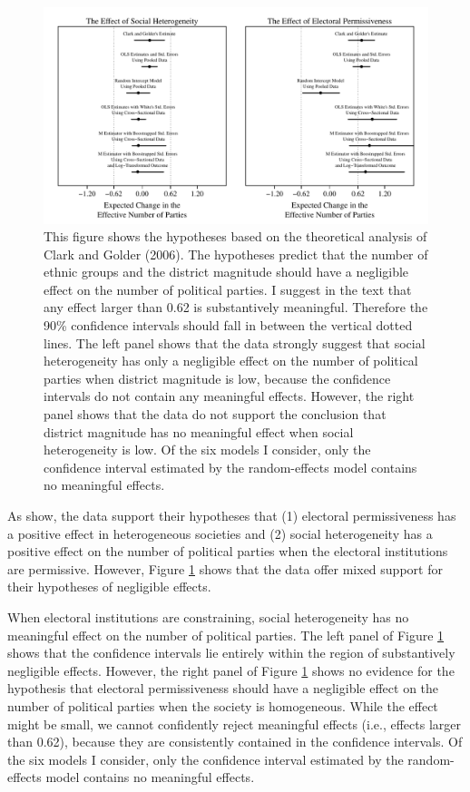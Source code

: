 \documentclass[12pt]{article}
\begin{document}
\begin{figure}
\begin{center}
\includegraphics[scale = .7]{Figures/cg.pdf}
\caption{This figure shows the hypotheses based on the theoretical analysis of Clark and Golder (2006).
The hypotheses predict that the number of ethnic groups and the district magnitude should have a negligible effect on the number of political parties. I suggest in the text that any effect larger than 0.62 is substantively meaningful. Therefore the 90\% confidence intervals should fall in between the vertical dotted lines. The left panel shows that the data strongly suggest that social heterogeneity has only a negligible effect on the number of political parties when district magnitude is low, because the confidence intervals do not contain any meaningful effects. However, the right panel shows that the data do not support the conclusion that district magnitude has no meaningful effect when social heterogeneity is low. Of the six models I consider, only the confidence interval estimated by the random-effects model contains no meaningful effects.}\label{fig:cg}
\end{center}
\end{figure}

As \cite{ClarkGolder2006} show, the data support their hypotheses that (1) electoral permissiveness has a positive effect in heterogeneous societies and (2) social heterogeneity has a positive effect on the number of political parties when the electoral institutions are permissive.  However, Figure \ref{fig:cg} shows that the data offer mixed support for their hypotheses of negligible effects. 

When electoral institutions are constraining, social heterogeneity has no meaningful effect on the number of political parties. The left panel of Figure \ref{fig:cg} shows that the confidence intervals lie entirely within the region of substantively negligible effects. However, the right panel of  Figure \ref{fig:cg} shows no evidence for the hypothesis that electoral permissiveness should have a negligible effect on the number of political parties when the society is homogeneous. While the effect might be small, we cannot confidently reject meaningful effects (i.e., effects larger than 0.62), because they are consistently contained in the confidence intervals. Of the six models I consider, only the confidence interval estimated by the random-effects model contains no meaningful effects.
\end{document}
